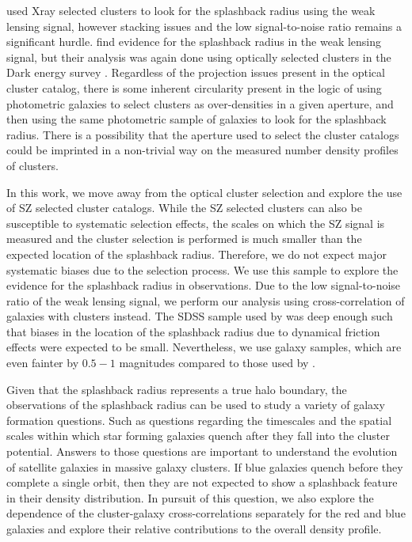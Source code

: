 \documentclass[iop, apjl, twocolappendix, numberedappendix]{emulateapj}
\begin{document}
\citet{umetsu2017lensing} used Xray selected clusters to look for
the splashback radius using the weak lensing signal, however
stacking issues and the low signal-to-noise ratio remains a significant
hurdle. \citet{chang2017splashback} find evidence for the splashback
radius in the weak lensing signal, but their analysis was again done
using optically selected clusters in the Dark energy survey
\citep{dark2005dark}. Regardless of the projection issues present in
the optical cluster catalog, there is some inherent circularity
present in the logic of using photometric galaxies to select
clusters as over-densities in a given aperture, and then using the
same photometric sample of galaxies to look for the splashback
radius. There is a possibility that the aperture used to select the
cluster catalogs could be imprinted in a non-trivial way on the
measured number density profiles of clusters. 

In this work, we move away from the optical cluster selection and
explore the use of SZ selected cluster catalogs. While the SZ
selected clusters can also be susceptible to systematic selection
effects, the scales on which the SZ signal is measured and the
cluster selection is performed is much smaller than the expected
location of the splashback radius. Therefore, we do not expect major
systematic biases due to the selection process. We use this sample
to explore the evidence for the splashback radius in observations.
Due to the low signal-to-noise ratio of the weak lensing signal, we
perform our analysis using cross-correlation of galaxies with
clusters instead. The SDSS sample used by \citet{more2016detection}
was deep enough such that biases in the location of the splashback
radius due to dynamical friction effects were expected to be small.
Nevertheless, we use galaxy samples, which are even fainter by
$0.5-1$ magnitudes compared to those used by
\citet{more2016detection}.

Given that the splashback radius represents a true halo boundary,
the observations of the splashback radius can be used to study a
variety of galaxy formation questions. Such as questions 
regarding the timescales and the spatial scales within
which star forming galaxies quench after they fall into the cluster
potential. Answers to those questions are important to understand 
the evolution of satellite galaxies in massive galaxy clusters. 
If blue galaxies quench before
they complete a single orbit, then they are not expected to show a
splashback feature in their density distribution. In pursuit of this
question, we also explore the dependence of the cluster-galaxy
cross-correlations separately for the red and blue galaxies and
explore their relative contributions to the overall density profile.
\end{document}
